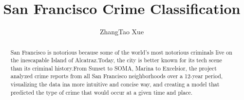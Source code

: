 \documentclass{amsart}
\begin{document}
%
%
\title[A Short Running Title]{ San Francisco Crime Classification}%

\author{ZhangTao Xue}
\address[A.~1]{School of Computer Science,\\ 
Xi'an Shiyou University, Shaanxi 710065, China}%


%
%
\date{\gitAuthorDate}%

\begin{abstract}
    San Francisco is notorious because some of the world's most notorious
    criminals live on the inescapable Island of Alcatraz.Today, the city 
    is better known for its tech scene than its criminal history.From 
    Sunset to SOMA, Marina to Excelsior, the project analyzed crime reports 
    from all San Francisco neighborhoods over a 12-year period, visualizing 
    the data ina more intuitive and concise way, and creating a model 
    that predicted the type of crime that would occur at a given time
    and place.
\end{abstract}

\maketitle
\tableofcontents

\newpage



\newpage




\listoftodos
\end{document}
